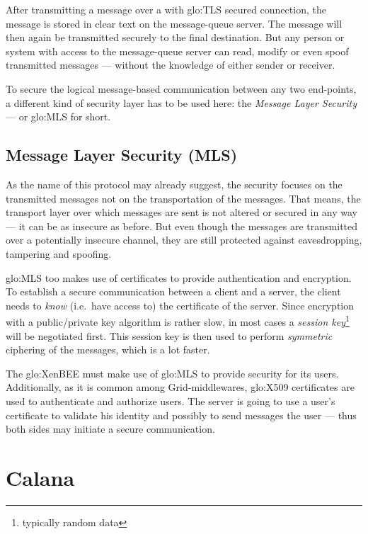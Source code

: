 After transmitting a message over a with \gls{glo:TLS} secured connection,
the  message is  stored in  clear text  on the  message-queue  server. The
message   will  then   again  be   transmitted  securely   to   the  final
destination. But  any person  or system with  access to  the message-queue
server can read, modify or even spoof transmitted messages --- without the
knowledge of either sender or receiver.

To  secure  the  logical   message-based  communication  between  any  two
end-points, a  different kind of security  layer has to be  used here: the
\emph{Message Layer Security} --- or \gls{glo:MLS} for short.

\subsection[Message Layer Security]{Message Layer Security (MLS)}

As the name of this protocol  may already suggest, the security focuses on
the transmitted messages not on  the transportation of the messages.  That
means, the transport layer over which  messages are sent is not altered or
secured in any way  --- it can be as insecure as  before.  But even though
the messages are transmitted over a potentially insecure channel, they are
still protected against eavesdropping, tampering and spoofing.

\gls{glo:MLS} too makes use  of certificates to provide authentication and
encryption. To  establish a  secure communication between  a client  and a
server,  the  client  needs  to  \emph{know}  (i.e.~have  access  to)  the
certificate  of the server.   Since encryption  with a  public/private key
algorithm   is    rather   slow,    in   most   cases    a   \emph{session
  key}\footnote{typically  random data}  will be  negotiated  first.  This
session  key is  then used  to perform  \emph{symmetric} ciphering  of the
messages, which is a lot faster.

\bigskip

The \gls{glo:XenBEE}  must make use  of \gls{glo:MLS} to  provide security
for  its users.   Additionally, as  it is  common  among Grid-middlewares,
\gls{glo:X509}  certificates  are   used  to  authenticate  and  authorize
users. The  server is going  to use a  user's certificate to  validate his
identity and  possibly to send messages  the user --- thus  both sides may
initiate a secure communication.

\section{Calana}
\label{sec:calana}

